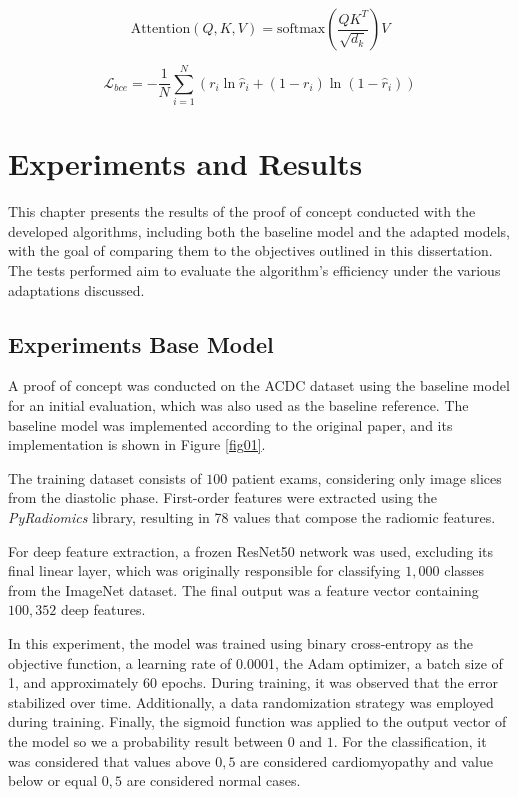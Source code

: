\documentclass[journal,twoside,web]{ieeecolor}
\begin{document}
\begin{equation}
\text{Attention}(Q, K, V) = \text{softmax}\left(\frac{QK^T}{\sqrt{d_k}}\right)V
\label{eq:attention}
\end{equation}

\begin{equation}
\mathcal{L}_{bce} = -\frac{1}{N} \sum_{i=1}^N
(r_i \ln \hat{r}_i + (1 - r_i) \ln (1 - \hat{r}_i))
\label{eq:bce}
\end{equation}


\section{Experiments and Results}

This chapter presents the results of the proof of concept conducted with the developed algorithms, including both the baseline model and the adapted models, with the goal of comparing them to the objectives outlined in this dissertation. The tests performed aim to evaluate the algorithm's efficiency under the various adaptations discussed.

\subsection{Experiments Base Model}

A proof of concept was conducted on the ACDC dataset using the baseline model for an initial evaluation, which was also used as the baseline reference. The baseline model was implemented according to the original paper, and its implementation is shown in Figure \ref{fig01}.  

The training dataset consists of $100$ patient exams, considering only image slices from the diastolic phase. First-order features were extracted using the \textit{PyRadiomics} library, resulting in 78 values that compose the radiomic features.  

For deep feature extraction, a frozen ResNet50 network was used, excluding its final linear layer, which was originally responsible for classifying $1,000$ classes from the ImageNet dataset. The final output was a feature vector containing $100,352$ deep features.  

In this experiment, the model was trained using binary cross-entropy as the objective function, a learning rate of 0.0001, the Adam optimizer, a batch size of 1, and approximately 60 epochs. During training, it was observed that the error stabilized over time. Additionally, a data randomization strategy was employed during training. Finally, the sigmoid function was applied to the output vector of the model so we a probability result between $0$ and $1$. For the classification, it was considered that values above $0,5$ are considered cardiomyopathy and value below or equal $0,5$ are considered normal cases.
\end{document}
